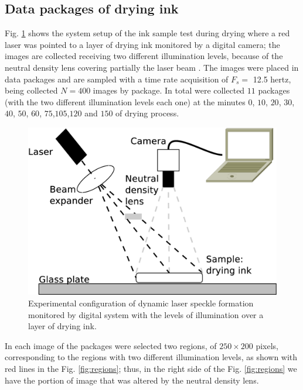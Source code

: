 \documentclass[review]{elsarticle}
\begin{document}
\subsection{Data packages of drying ink}
\label{sec:descriptionink}
Fig. \ref{fig:system} shows the system setup of the ink sample test during drying where
a red laser was pointed to a layer of drying ink monitored by a digital camera;
the images are collected receiving two different illumination levels, because of the neutral 
density lens covering partially the laser beam \cite{REIS2016}.
The images were placed in data packages and
are sampled with a time rate acquisition of $F_s=$ 12.5 hertz, being 
collected $N=400$ images by package. In total were collected $11$ packages 
(with the two different illumination levels each one) at the minutes 
$0$, $10$, $20$, $30$, $40$, $50$, $60$, $75$,$105$,$120$ and $150$ of drying process. 
\begin{figure}[ht!]
\centering
\includegraphics[width=0.65\columnwidth]{system.eps}
\caption{Experimental configuration of dynamic laser speckle formation monitored by digital system with the levels of illumination over a layer of drying ink.}
\label{fig:system}
\end{figure}
In each image of the packages were selected two regions, of $250\times200$ pixels, 
corresponding to the regions with two different illumination levels, 
as shown with red lines in the Fig. \ref{fig:regions}; thus, in the right side of the Fig. \ref{fig:regions}  we have the
portion of image that was altered by the neutral density lens. 
\end{document}

